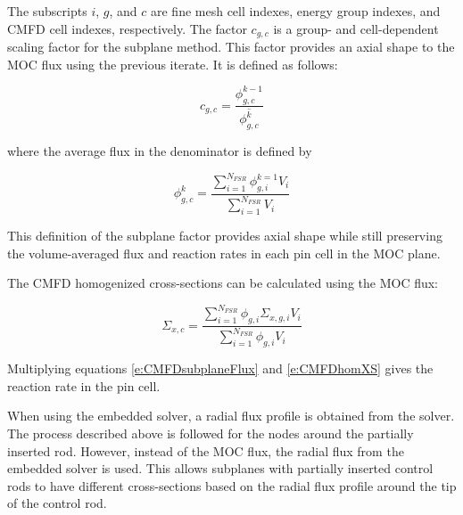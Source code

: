 {The subscripts $i$, $g$, and $c$ are fine mesh cell indexes, energy group indexes, and CMFD cell indexes, respectively.  The factor $c_{g,c}$ is a group- and cell-dependent scaling factor for the subplane method.  This factor provides an axial shape to the MOC flux using the previous iterate.  It is defined as follows:

\begin{equation}\label{e:CMFDsubplaneFactor}
c_{g,c} = \frac{\phi^{k-1}_{g,c}}{\overline{\phi^k_{g,c}}}
\end{equation}

where the average flux in the denominator is defined by

\begin{equation}\label{e:CMFDaverageFlux}
\phi^k_{g,c} = \frac{\sum_{i=1}^{N_{FSR}} \phi^{k=1}_{g,i} V_i}{\sum_{i=1}^{N_{FSR}} V_i}
\end{equation}

This definition of the subplane factor provides axial shape while still preserving the volume-averaged flux and reaction rates in each pin cell in the MOC plane.

The CMFD homogenized cross-sections can be calculated using the MOC flux:

\begin{equation}\label{e:CMFDhomXS}
\Sigma_{x,c} = \frac{\sum_{i=1}^{N_{FSR}} \phi_{g,i}\Sigma_{x,g,i}V_i}{\sum_{i=1}^{N_{FSR}} \phi_{g,i}V_i}
\end{equation}

Multiplying equations \ref{e:CMFDsubplaneFlux} and \ref{e:CMFDhomXS} gives the reaction rate in the pin cell.

When using the embedded solver, a radial flux profile is obtained from the solver.  The process described above is followed for the nodes around the partially inserted rod.  However, instead of the MOC flux, the radial flux from the embedded solver is used.  This allows subplanes with partially inserted control rods to have different cross-sections based on the radial flux profile around the tip of the control rod.

}
